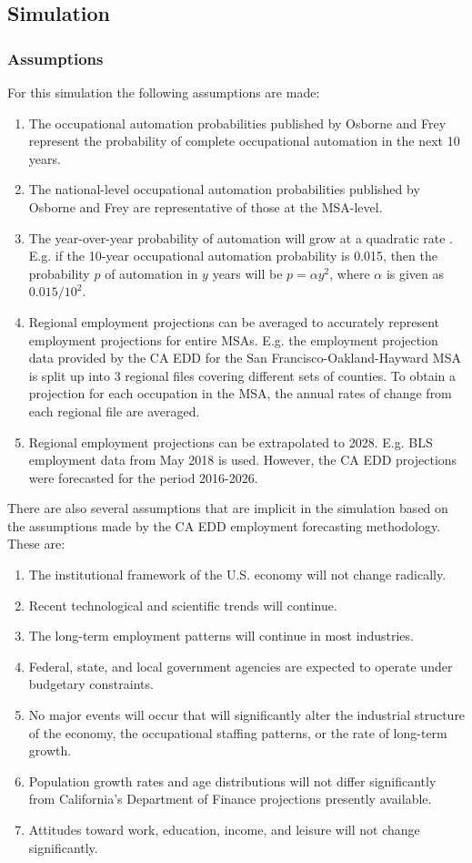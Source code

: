 \documentclass[10pt]{article}
\begin{document}
\subsection{Simulation}

\subsubsection{Assumptions}
For this simulation the following assumptions are made:
\begin{enumerate}
    \item The occupational automation probabilities published by Osborne and Frey represent the probability of complete occupational automation in the next 10 years.
    \item The national-level occupational automation probabilities published by Osborne and Frey are representative of those at the MSA-level.
    \item The year-over-year probability of automation will grow at a quadratic rate \cite{quadFit}. E.g. if the 10-year occupational automation probability is 0.015, then the probability $p$ of automation in $y$ years will be $p = \alpha y^2$, where $\alpha$ is given as $0.015 / 10^2$.
    \item Regional employment projections can be averaged to accurately represent employment projections for entire MSAs. E.g. the employment projection data provided by the CA EDD for the San Francisco-Oakland-Hayward MSA is split up into 3 regional files covering different sets of counties. To obtain a projection for each occupation in the MSA, the annual rates of change from each regional file are averaged.
    \item Regional employment projections can be extrapolated to 2028. E.g. BLS employment data from May 2018 is used. However, the CA EDD projections were forecasted for the period 2016-2026.
\end{enumerate}
There are also several assumptions that are implicit in the simulation based on the assumptions made by the CA EDD employment forecasting methodology. These are:
\begin{enumerate}
    \item The institutional framework of the U.S. economy will not change radically.
    \item Recent technological and scientific trends will continue.
    \item The long-term employment patterns will continue in most industries.
    \item Federal, state, and local government agencies are expected to operate under budgetary constraints.
    \item No major events will occur that will significantly alter the industrial structure of the economy, the occupational staffing patterns, or the rate of long-term growth.
    \item Population growth rates and age distributions will not differ significantly from California's Department of Finance projections presently available.
    \item Attitudes toward work, education, income, and leisure will not change significantly.
\end{enumerate}
\end{document}
